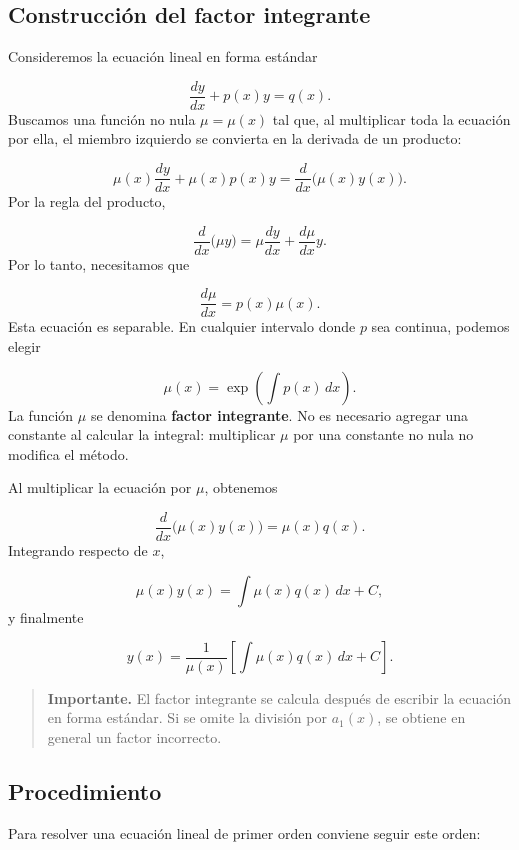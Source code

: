\documentclass[12pt,a4paper]{article}
\begin{document}
	\subsection{Construcción del factor integrante}

	Consideremos la ecuación lineal en forma estándar

	\[
	\frac{dy}{dx}+p(x)y=q(x).
	\]
	Buscamos una función no nula \(\mu=\mu(x)\) tal que, al multiplicar toda la ecuación por ella, el miembro izquierdo se convierta en la derivada de un producto:

	\[
	\mu(x)\frac{dy}{dx}+\mu(x)p(x)y
	=
	\frac{d}{dx}\bigl(\mu(x)y(x)\bigr).
	\]
	Por la regla del producto,

	\[
	\frac{d}{dx}\bigl(\mu y\bigr)
	=
	\mu\frac{dy}{dx}+\frac{d\mu}{dx}y.
	\]
	Por lo tanto, necesitamos que

	\[
	\frac{d\mu}{dx}=p(x)\mu(x).
	\]
	Esta ecuación es separable. En cualquier intervalo donde \(p\) sea continua, podemos elegir

	\[
	\boxed{
	\mu(x)=\exp\left(\int p(x)\,dx\right).
	}
	\]
	La función \(\mu\) se denomina \textbf{factor integrante}. No es necesario agregar una constante al calcular la integral: multiplicar \(\mu\) por una constante no nula no modifica el método.

	Al multiplicar la ecuación por \(\mu\), obtenemos

	\[
	\frac{d}{dx}\bigl(\mu(x)y(x)\bigr)
	=
	\mu(x)q(x).
	\]
	Integrando respecto de \(x\),

	\[
	\mu(x)y(x)
	=
	\int \mu(x)q(x)\,dx+C,
	\]
	y finalmente

	\[
	\boxed{
	y(x)
	=
	\frac{1}{\mu(x)}
	\left[
	\int \mu(x)q(x)\,dx+C
	\right].
	}
	\]

	\begin{quote}
		\textbf{Importante.} El factor integrante se calcula después de escribir la ecuación en forma estándar. Si se omite la división por \(a_1(x)\), se obtiene en general un factor incorrecto.
	\end{quote}

	\subsection{Procedimiento}

	Para resolver una ecuación lineal de primer orden conviene seguir este orden:
\end{document}
